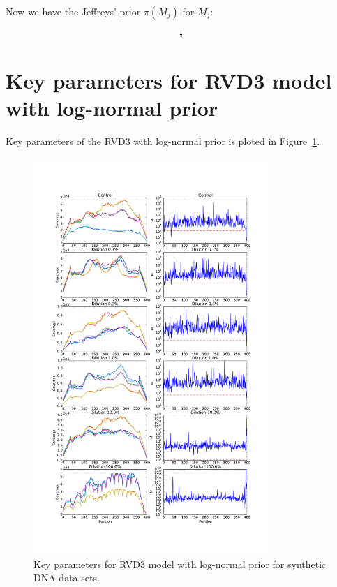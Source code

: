 \documentclass{bioinfo}
\begin{document}
Now we have the Jeffreys' prior $\pi\left({M}_{j}\right)$ for $M_{j}$:

\begin{equation}
[-\left(\Psi_{1}(M_{j}) - \Psi_{1}(\mu_{j} M_{j})\mu_{j}^{2} - \Psi_{1}((1-\mu_{j})M_{j}){(1-\mu_{j})^{2}}\right)]^{\frac{1}{2}}
\end{equation}


\section{Key parameters for RVD3 model with log-normal prior}\label{sec:appendix_parameters}
Key parameters of the RVD3 with log-normal prior is ploted in Figure~\ref{fig:M_lognormal}.

\begin{figure}[htbp]
\begin{center}
\includegraphics[width=90mm]{figs/M_lognormal.pdf}
\caption{Key parameters for RVD3 model with log-normal prior for synthetic DNA data sets.}
\label{fig:M_lognormal}
\end{center}
\end{figure}
\end{document}
